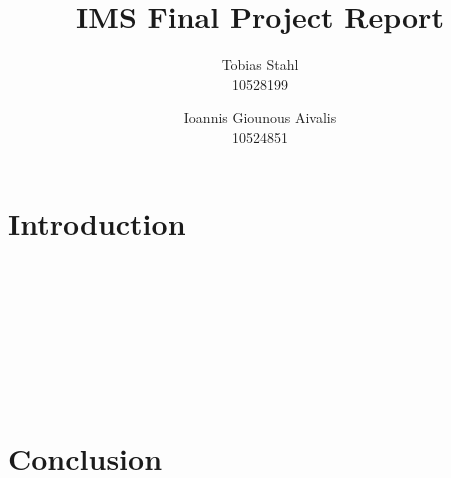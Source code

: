 \documentclass[11pt]{article}
\title{
	\textbf{IMS Final Project Report}
}
\author{Tobias Stahl \\ 10528199 \and Ioannis Giounous Aivalis \\ 10524851 }
\begin{document}
\maketitle

\section{Introduction}

\section{~}

\section{~}

\section{Conclusion}
\end{document}
